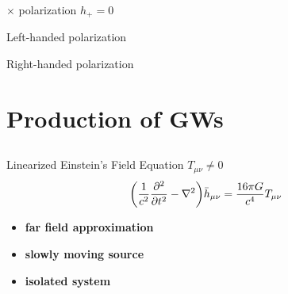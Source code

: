 \documentclass{beamer}
\theoremstyle{definition}
\theoremstyle{plain}
\begin{document}
\begin{frame}{$\times$ polarization $h_{+}=0$}
	\begin{figure}
    \centering
    \end{figure}
\end{frame}

\begin{frame}{Left-handed polarization}
	\begin{figure}
    \centering
    \end{figure}
\end{frame}

\begin{frame}{Right-handed polarization}
	\begin{figure}
    \centering
    \end{figure}
\end{frame}

\section{Production of GWs}
\subsection{}
\begin{frame}{Linearized Einstein's Field Equation $T_{\mu \nu} \neq  0$}
\[
\qty(
\dfrac{1}{c^{2}}
\pdv[2]{}{t}
-
\nabla ^{2}
)
\bar{h} _{\mu \nu} =\dfrac{16 \pi G}{c^{4}} T_{\mu \nu}
\]
\vspace{1cm}

\begin{itemize}
\item \textbf{far field approximation}%
\vspace{0.3cm}
\item \textbf{slowly moving source}%
\vspace{0.3cm}

\item \textbf{isolated system}%

\end{itemize}
\end{frame}
\end{document}
